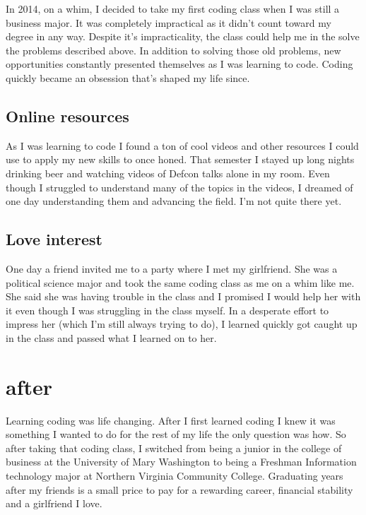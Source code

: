 \documentclass[titlepage]{article}
\begin{document}
In 2014, on a whim, I decided to take my first coding class when I was still a business major. It was completely impractical as it didn't count toward my degree in any way. Despite it's impracticality, the class could help me in the solve the problems described above. In addition to solving those old problems, new opportunities constantly presented themselves as I was learning to code. Coding quickly became an obsession that's shaped my life since.

\subsection{Online resources}

As I was learning to code I found a ton of cool videos and other resources I could use to apply my new skills to once honed. That semester I stayed up long nights drinking beer and watching videos of Defcon talks alone in my room. Even though I struggled to understand many of the topics in the videos, I dreamed of one day understanding them and advancing the field. I'm not quite there yet. 

\subsection{Love interest}

One day a friend invited me to a party where I met my girlfriend. She was a political science major and took the same coding class as me on a whim like me. She said she was having trouble in the class and I promised I would help her with it even though I was struggling in the class myself. In a desperate effort to impress her (which I'm still always trying to do), I learned quickly got caught up in the class and passed what I learned on to her. 

\section{after}

Learning coding was life changing. After I first learned coding I knew it was something I wanted to do for the rest of my life the only question was how. So after taking that coding class, I switched from being a junior in the college of business at the University of Mary Washington to being a Freshman Information technology major at Northern Virginia Community College. Graduating years after my friends is a small price to pay for a rewarding career, financial stability and a girlfriend I love. 
\end{document}
